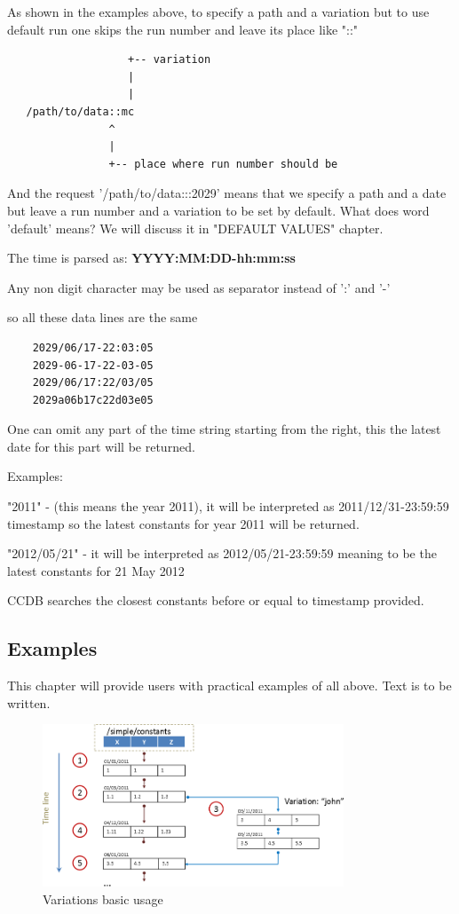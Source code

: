 \documentclass{article}
\begin{document}
As shown in the examples above, to specify a path and a variation but
to use default run one skips the run number and leave its place like "::"
\begin{verbatim}
                   +-- variation
                   |
                   |
   /path/to/data::mc
                ^
                |
                +-- place where run number should be
\end{verbatim}


And the request '/path/to/data:::2029' means that we specify a path and a date
but leave a run number and a variation to be set by default.
What does word 'default' means? We will discuss it in "DEFAULT VALUES" chapter.

The time is parsed as:
    \textbf{YYYY:MM:DD-hh:mm:ss}

Any non digit character may be used as separator instead of ':' and '-'

so all these data lines are the same
\begin{verbatim}
    2029/06/17-22:03:05
    2029-06-17-22-03-05
    2029/06/17:22/03/05
    2029a06b17c22d03e05
\end{verbatim}

One can omit any part of the time string starting from the right, this the 
latest date for this part will be returned.

Examples:

"2011" - (this means the year 2011), it will be interpreted as
2011/12/31-23:59:59 timestamp so the latest constants for year
2011 will be returned.


"2012/05/21" - it will be interpreted as 2012/05/21-23:59:59 meaning to be the
latest constants for 21 May 2012

CCDB searches the closest constants before or equal to timestamp provided.


\subsection{Examples}

This chapter will provide users with practical examples of all above.
Text is to be written.

\begin{figure}[h]
  \centering
  \includegraphics[width=0.8\textwidth]{pics/variations_example1}
  \caption{Variations basic usage}
\end{figure}
\end{document}

